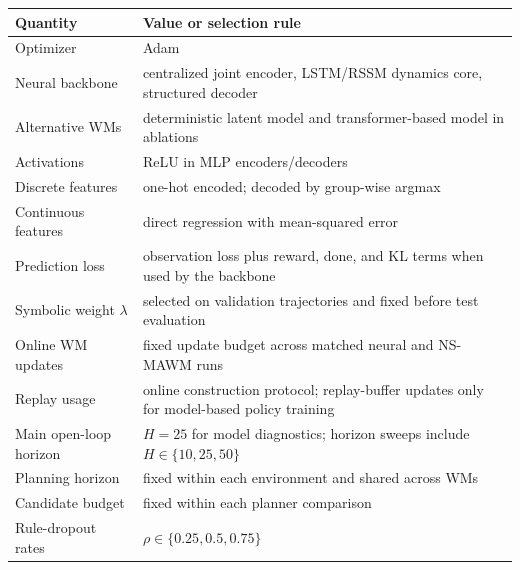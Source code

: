 \documentclass{article}
\theoremstyle{plain}
\theoremstyle{definition}
\theoremstyle{remark}
\begin{document}
\begin{table}[h!]
  \centering
  \footnotesize
  \begin{tabular}{ll}
    \toprule
    \textbf{Quantity}         & \textbf{Value or selection rule}                                                         \\
    \midrule
    Optimizer                 & Adam                                                                                     \\
    Neural backbone           & centralized joint encoder, LSTM/RSSM dynamics core, structured decoder                   \\
    Alternative WMs           & deterministic latent model and transformer-based model in ablations                      \\
    Activations               & ReLU in MLP encoders/decoders                                                            \\
    Discrete features         & one-hot encoded; decoded by group-wise argmax                                            \\
    Continuous features       & direct regression with mean-squared error                                                \\
    Prediction loss           & observation loss plus reward, done, and KL terms when used by the backbone               \\
    Symbolic weight $\lambda$ & selected on validation trajectories and fixed before test evaluation                     \\
    Online WM updates         & fixed update budget across matched neural and NS-MAWM runs                               \\
    Replay usage              & online construction protocol; replay-buffer updates only for model-based policy training \\
    Main open-loop horizon    & $H=25$ for model diagnostics; horizon sweeps include $H\in\{10,25,50\}$                  \\
    Planning horizon          & fixed within each environment and shared across WMs                                      \\
    Candidate budget          & fixed within each planner comparison                                                     \\
    Rule-dropout rates        & $\rho\in\{0.25,0.5,0.75\}$                                                               \\

\end{tabular}
\end{table}
\end{document}
